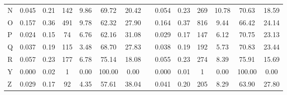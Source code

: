 \begin{tabular}{lccccccccccccc}
\hspace{3mm}N & 0.045 & 0.21 & 142 & 9.86 & 69.72 & 20.42 &   & 0.054 & 0.23 & 269 & 10.78 & 70.63 & 18.59 \\
\hspace{3mm}O & 0.157 & 0.36 & 491 & 9.78 & 62.32 & 27.90 &   & 0.164 & 0.37 & 816 & 9.44 & 66.42 & 24.14 \\
\hspace{3mm}P & 0.024 & 0.15 & 74 & 6.76 & 62.16 & 31.08 &   & 0.029 & 0.17 & 147 & 6.12 & 70.75 & 23.13 \\
\hspace{3mm}Q & 0.037 & 0.19 & 115 & 3.48 & 68.70 & 27.83 &   & 0.038 & 0.19 & 192 & 5.73 & 70.83 & 23.44 \\
\hspace{3mm}R & 0.057 & 0.23 & 177 & 6.78 & 75.14 & 18.08 &   & 0.055 & 0.23 & 274 & 8.39 & 75.91 & 15.69 \\
\hspace{3mm}Y & 0.000 & 0.02 & 1 & 0.00 & 100.00 & 0.00 &   & 0.000 & 0.01 & 1 & 0.00 & 100.00 & 0.00 \\
\hspace{3mm}Z & 0.029 & 0.17 & 92 & 4.35 & 57.61 & 38.04 &   & 0.041 & 0.20 & 205 & 8.29 & 63.90 & 27.80 \\
\bottomrule
\end{tabular}

